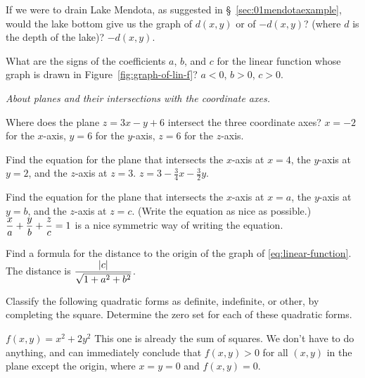 \begin{center}
\end{center}
\begin{multicols}{2}
\problem If we were to drain Lake Mendota, 
as suggested in \S~\ref{sec:01mendotaexample}, would the lake bottom give us the
graph of $d(x, y)$ or of $-d(x,y)$?  (where $d$ is the depth of the lake)?
\answer
$-d(x,y)$.
\endanswer

\problem What are the signs of the coefficients $a$, $b$, and $c$ 
for the linear function whose graph is drawn in Figure~\ref{fig:graph-of-lin-f}?
\answer 
$a<0$, $b>0$, $c>0$.
\endanswer

\problem \itshape About planes and their intersections with the coordinate 
axes.\upshape

\subprob Where does the plane $z=3x-y+6$ intersect the three coordinate axes?
\answer
$x=-2$ for the $x$-axis, $y=6$ for the $y$-axis, $z=6$ for the $z$-axis.
\endanswer

\subprob Find the equation for the plane that intersects 
the $x$-axis at $x=4$, the $y$-axis at $y=2$, and the $z$-axis at $z=3$.
\answer
$z = 3 - \frac34 x - \frac32y$.
\endanswer

\subprob Find the equation for the plane that intersects 
the $x$-axis at $x=a$, the $y$-axis at $y=b$, and the $z$-axis at $z=c$.  (Write
the equation as nice as possible.)
\answer  
$\displaystyle \frac{x}{a} + \frac{y}{b} + \frac{z}{c} = 1$ is a nice symmetric way of
writing the equation.
\endanswer

\problem Find a formula for the distance to the origin of the graph of 
\eqref{eq:linear-function}.
\answer
The distance is $\displaystyle \frac{|c|}{\sqrt{1+a^2+b^2}}$.
\endanswer

\problem 
Classify the following quadratic forms as definite, indefinite, or other, by
completing the square.  Determine the zero set for each of these quadratic forms.

\subprob $f(x, y) = x^2+2y^2$
\answer
This one is already the sum of squares.  We don't have to do anything, and can
immediately conclude that $f(x, y)>0$ for all $(x,y)$ in the plane except the origin,
where $x=y=0$ and $f(x, y) = 0$.
\endanswer


\end{multicols}
